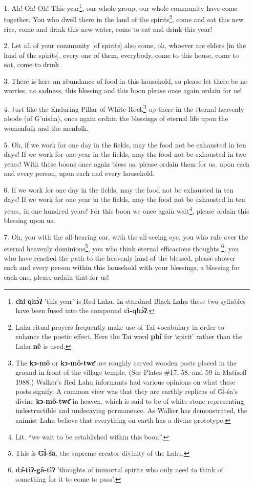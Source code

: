 \setcounter{footnote}{0}

1. Ah! Oh! Oh! This year\footnote{\textbf{chi} \textbf{qhɔ̀ʔ} 'this year' is Red Lahu. In standard Black Lahu these two syllables have been fused into the compound \textbf{cì-qhɔ̀ʔ}.}, our whole group, our whole community have come together.
You who dwell there in the land of the spirits\footnote{Lahu ritual prayers frequently make use of Tai vocabulary in order to enhance the poetic effect. Here the Tai word \textbf{phí }for `spirit' rather than the Lahu \textbf{nê} is used.}, come and eat this new rice,
come and drink this new water, come to eat and drink this year!

2. Let all of your community [of spirits] also come, oh, whoever are elders [in
the land of the spirits], every one of them, everybody, come to this house, come
to eat, come to drink.

3. There is here an abundance of food in this household, so please let there be
no worries, no sadness, this blessing and this boon please once again ordain for
us!

4. Just like the Enduring Pillar of White Rock\footnote{The \textbf{kɔ-mô} or \textbf{kɔ-mô-twɛ̄} are roughly carved wooden posts placed in the ground in front of the village temple. (See Plates \#17, 58, and 59 in Matisoff 1988.) Walker's Red Lahu informants had various opinions on what these posts signify. A common view was that they are earthly replicas of G̈ɨ̀-ša's divine \textbf{kɔ-mô-twɛ̄} in heaven, which is said to be of white stone representing indestructible and undecaying permanence. As Walker has demonstrated, the animist Lahu believe that everything on earth has a divine prototype.} up there in the eternal heavenly
abode (of G'uisha), once again ordain the blessings of eternal life upon the womenfolk
and the menfolk.

5. Oh, if we work for one day in the fields, may the food not be exhausted in ten
days! If we work for one year in the fields, may the food not be exhausted in
two years! With these boons once again bless us; please ordain them for us, upon
each and every person, upon each and every household.

6. If we work for one day in the fields, may the food not be exhausted in ten days!
If we work for one year in the fields, may the food not be exhausted in ten years,
in one hundred years! For this boon we once again wait\footnote{Lit. ``we wait to be established within this boon''.}, please ordain this
blessing upon us.

7. Oh, you with the all-hearing ear, with the all-seeing eye, you who rule over
the eternal heavenly dominions\footnote{This is \textbf{G̈ɨ̀-ša}, the supreme creator divinity of the Lahu.}, you who think eternal efficacious thoughts
\footnote{\textbf{dɔ̂-tìʔ-gâ-tìʔ} 'thoughts of immortal spirits who only need to think of something for it to come to pass'.}, you who have reached the path to the heavenly land of the blessed, please
shower each and every person within this household with your blessings, a blessing
for each one, please ordain that for us!

